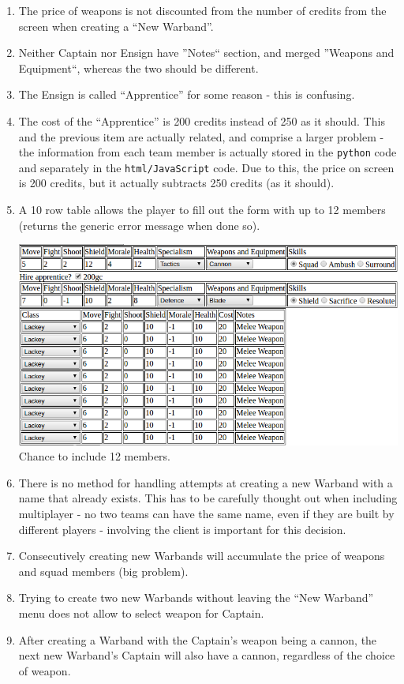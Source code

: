 \documentclass[12pt,a4paper]{article}
\begin{document}
\begin{enumerate}
 \item The price of weapons is not discounted from the number of credits from the screen when creating a ``New Warband''.
 \item Neither Captain nor Ensign have ''Notes`` section, and merged ''Weapons and Equipment``, whereas the two should be different.
 \item The Ensign is called ``Apprentice'' for some reason - this is confusing.
 \item The cost of the ``Apprentice'' is 200 credits instead of 250 as it should. This and the previous item are actually related, and comprise a larger problem - the information from each team member is actually stored in the \texttt{python} code and separately in the \texttt{html/JavaScript} code. Due to this, the price on screen is 200 credits, but it actually subtracts 250 credits (as it should). 
 \item A 10 row table allows the player to fill out the form with up to 12 members (returns the generic error message when done so).\\
 \begin{minipage}[t]{\linewidth}
 \centering
 \includegraphics[width=1\textwidth]{img/twelve_members}
 Chance to include 12 members.
 \end{minipage}
 
 \item There is no method for handling attempts at creating a new Warband with a name that already exists. This has to be carefully thought out when including multiplayer - no two teams can have the same name, even if they are built by different players - involving the client is important for this decision.
 \item Consecutively creating new Warbands will accumulate the price of weapons and squad members (big problem).
 \item Trying to create two new Warbands without leaving the ``New Warband'' menu does not allow to select weapon for Captain.
 \item After creating a Warband with the Captain's weapon being a cannon, the next new Warband's Captain will also have a cannon, regardless of the choice of weapon.

\end{enumerate}
\end{document}

